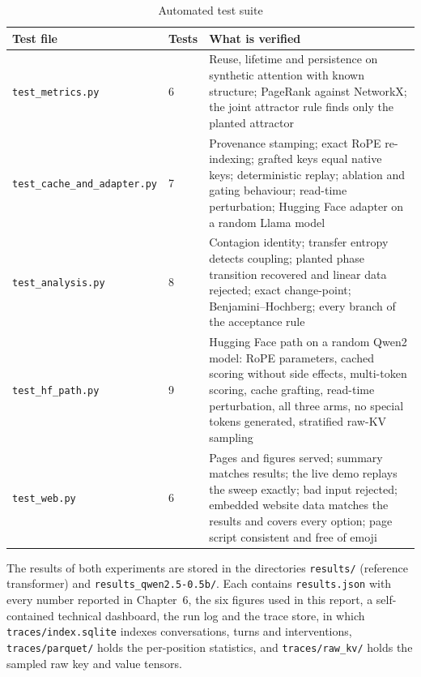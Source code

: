 \begin{table}[htbp]
\centering
\caption{Automated test suite}\label{tab:tests}
\small
\begin{tabularx}{\textwidth}{@{}L{5.0cm}L{1.0cm}Y@{}}
\toprule
\textbf{Test file} & \textbf{Tests} & \textbf{What is verified} \\
\midrule
\texttt{test\_metrics.py} & 6 & Reuse, lifetime and persistence on synthetic attention with known structure; PageRank against NetworkX; the joint attractor rule finds only the planted attractor \\
\texttt{test\_cache\_and\_adapter.py} & 7 & Provenance stamping; exact RoPE re-indexing; grafted keys equal native keys; deterministic replay; ablation and gating behaviour; read-time perturbation; Hugging Face adapter on a random Llama model \\
\texttt{test\_analysis.py} & 8 & Contagion identity; transfer entropy detects coupling; planted phase transition recovered and linear data rejected; exact change-point; Benjamini--Hochberg; every branch of the acceptance rule \\
\texttt{test\_hf\_path.py} & 9 & Hugging Face path on a random Qwen2 model: RoPE parameters, cached scoring without side effects, multi-token scoring, cache grafting, read-time perturbation, all three arms, no special tokens generated, stratified raw-KV sampling \\
\texttt{test\_web.py} & 6 & Pages and figures served; summary matches results; the live demo replays the sweep exactly; bad input rejected; embedded website data matches the results and covers every option; page script consistent and free of emoji \\
\bottomrule
\end{tabularx}
\end{table}

The results of both experiments are stored in the directories \nolinkurl{results/} (reference transformer) and \nolinkurl{results_qwen2.5-0.5b/}. Each contains \texttt{results.json} with every number reported in Chapter~6, the six figures used in this report, a self-contained technical dashboard, the run log and the trace store, in which \nolinkurl{traces/index.sqlite} indexes conversations, turns and interventions, \nolinkurl{traces/parquet/} holds the per-position statistics, and \nolinkurl{traces/raw_kv/} holds the sampled raw key and value tensors.
